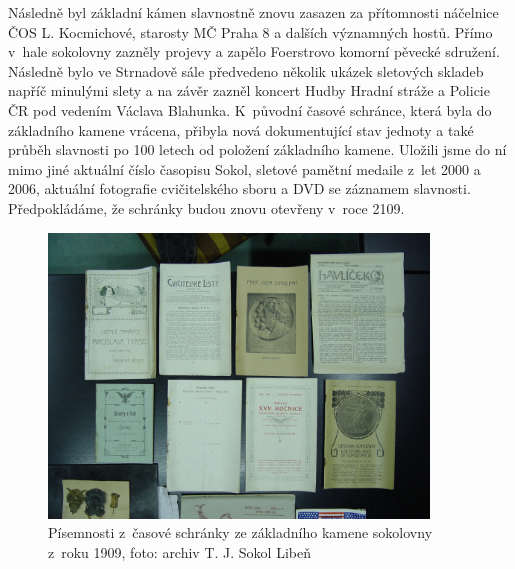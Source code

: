 \documentclass[a5paper, 11pt, twoside]{article}
\begin{document}
Následně byl základní kámen slavnostně znovu zasazen za přítomnosti
náčelnice ČOS L. Kocmichové, starosty MČ Praha 8 a dalších významných
hostů. Přímo v~hale sokolovny zazněly projevy a zapělo Foerstrovo
komorní pěvecké sdružení. Následně bylo ve Strnadově sále předvedeno
několik ukázek sletových skladeb napříč minulými slety a na závěr zazněl
koncert Hudby Hradní stráže a Policie ČR pod vedením Václava Blahunka.
K~původní časové schránce, která byla do základního kamene vrácena,
přibyla nová dokumentující stav jednoty a také průběh slavnosti po 100
letech od položení základního kamene. Uložili jsme do ní mimo jiné
aktuální číslo časopisu Sokol, sletové pamětní medaile z~let 2000 a
2006, aktuální fotografie cvičitelského sboru a DVD se záznamem
slavnosti. Předpokládáme, že schránky budou znovu otevřeny v~roce 2109.

\begin{figure}[h]
  \centering 
  \includegraphics[width=0.9\textwidth]{img/59_schranka_2.jpg}
  \caption*{Písemnosti z~časové schránky ze základního kamene sokolovny z~roku
  1909, foto: archiv T. J. Sokol Libeň}
\end{figure}
\end{document}
